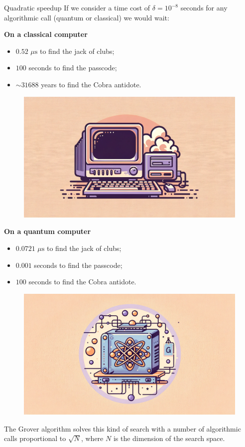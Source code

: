 \documentclass[aspectratio=169, 8pt, xcolor={svgnames}, hyperref={linkcolor=black}]{beamer}
\begin{document}
\begin{frame}{Quadratic speedup}
If we consider a time cost of $\delta=10^{-8}$ seconds for any algorithmic call (quantum or classical) we would wait:
\begin{multicols}{2}
\textbf{On a classical computer}
\begin{itemize}[noitemsep]
\item[\footnotesize\faCircle] $0.52\,\,\mu \text{s}$ to find the jack of clubs;
\item[\footnotesize\faCircle] $100$ seconds to find the passcode;
\item[\footnotesize\faCircle] $\sim 31688$ years to find the Cobra antidote.
\end{itemize}
\begin{figure}
    \includegraphics[width=.35\textwidth]{figures/ccomp.png}
\end{figure}

\textbf{On a quantum computer}
\begin{itemize}[noitemsep]
\item[\footnotesize\faCircle] $0.0721\,\,\mu \text{s}$ to find the jack of clubs;
\item[\footnotesize\faCircle] $0.001$ seconds to find the passcode;
\item[\footnotesize\faCircle] $100$ seconds to find the Cobra antidote.
\end{itemize}
\begin{figure}
    \includegraphics[width=.35\textwidth]{figures/qcomp.png}
\end{figure}
\end{multicols}
\begin{tcolorbox}[colback=red!15]
The Grover algorithm solves this kind of search with a number of algorithmic calls 
proportional to $\sqrt{N}$, where $N$ is the dimension of the search space.
\end{tcolorbox}
\end{frame}
\end{document}
